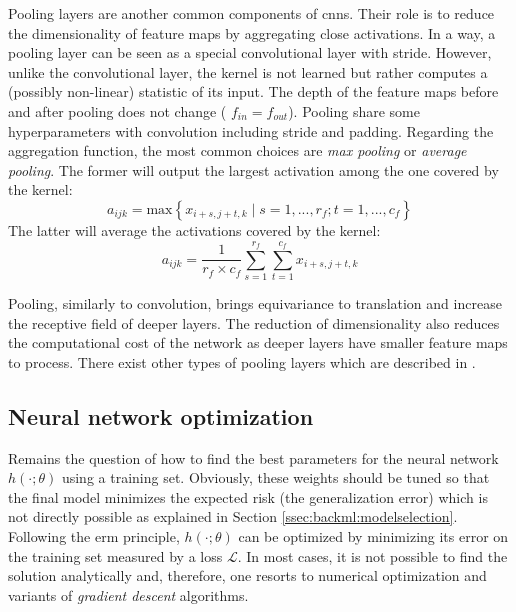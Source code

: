Pooling layers are another common components of \acrshort{cnn}s. Their role is to
reduce the dimensionality of feature maps by aggregating close activations. In a
way, a pooling layer can be seen as a special convolutional layer with stride. However, 
unlike the convolutional layer, the kernel is not learned but rather computes a (possibly 
non-linear) statistic of its input.
The depth of the feature maps before and after pooling does not change (\ie
$f_{in} = f_{out}$). Pooling share some hyperparameters with convolution including
stride and padding. Regarding the aggregation function, the most common choices
are \textit{max pooling} or \textit{average pooling}. The former will output the
largest activation among the one covered by the kernel:
\begin{equation}
\label{eqn:backml:maxpooling}
a_{ijk} = \text{max} \left\{ x_{i+s,j+t,k} \mid s = 1, ..., r_f; t = 1, ..., c_f \right\}
\end{equation}
The latter will average the activations covered by the kernel:
\begin{equation}
\label{eqn:backml:avgpooling}
a_{ijk} = \frac{1}{r_f \times c_f} \sum_{s=1}^{r_f} \sum_{t=1}^{c_f}  x_{i+s,j+t,k}
\end{equation}

Pooling, similarly to convolution, brings equivariance to translation and increase
the receptive field of deeper layers. The reduction of dimensionality also reduces
the computational cost of the network as deeper layers have smaller feature maps
to process. There exist other types of pooling layers which are described in
\cite{gholamalinezhad2020pooling}.

\subsection{Neural network optimization}
\label{ssec:backml:dl:opti}
Remains the question of how to find the best parameters for the neural network
$h(\cdot; \theta)$ using a training set. Obviously, these weights should be tuned
so that the final model minimizes the expected risk (\ie the generalization error)
which is not directly possible as explained in Section \ref{ssec:backml:modelselection}.
Following the \acrshort{erm} principle, $h(\cdot; \theta)$ can be optimized by
minimizing its error on the training set measured by a loss $\mathcal{L}$. In most
cases, it is not possible to find the solution analytically and, therefore, one
resorts to numerical optimization and variants of \textit{gradient descent}
algorithms.

